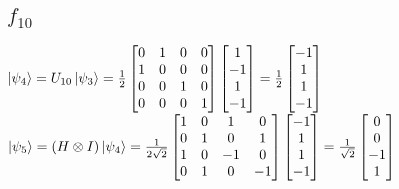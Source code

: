 \documentclass{iansnotes}
\begin{document}
\subsection{$f_{10}$}
$\ket{\psi_4} = U_{10} \ket{\psi_3} = \frac{1}{2}\begin{bmatrix} 0 & 1 & 0 & 0 \\ 1 & 0 & 0 & 0 \\ 0 & 0 & 1 & 0 \\ 0 & 0 & 0 & 1 \end{bmatrix}\begin{bmatrix} 1 \\ -1 \\ 1 \\ -1 \end{bmatrix} = \frac{1}{2}\begin{bmatrix} -1 \\ 1 \\ 1 \\ -1 \end{bmatrix}$\\[12mm]
\noindent$\ket{\psi_5} = (H \otimes I) \ket{\psi_4} = \frac{1}{2\sqrt{2}} \begin{bmatrix} 1 & 0 & 1 & 0 \\ 0 & 1 & 0 & 1 \\ 1 & 0 & -1 & 0 \\ 0 & 1 & 0 & -1 \end{bmatrix} \begin{bmatrix} -1 \\ 1 \\ 1 \\ -1 \end{bmatrix} = \frac{1}{\sqrt{2}} \begin{bmatrix} 0 \\ 0 \\ -1 \\ 1 \end{bmatrix}$\\[20mm]
\end{document}
